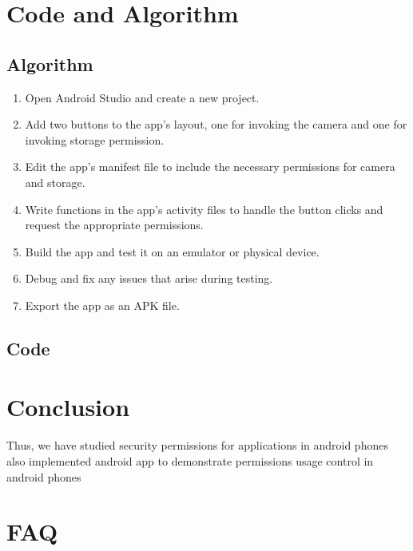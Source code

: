 \documentclass[11pt]{article}
\begin{document}
\section{Code and Algorithm}
\subsection{Algorithm}
\begin{enumerate}
    \item Open Android Studio and create a new project.
    \item Add two buttons to the app's layout, one for invoking the camera and one for invoking storage permission.
    \item Edit the app's manifest file to include the necessary permissions for camera and storage.
    \item Write functions in the app's activity files to handle the button clicks and request the appropriate permissions.
    \item Build the app and test it on an emulator or physical device.
    \item Debug and fix any issues that arise during testing.
    \item Export the app as an APK file.
\end{enumerate}

\subsection{Code}





\section{Conclusion}
Thus, we have studied security permissions for applications in android phones also
implemented android app to demonstrate permissions usage control in android phones
\clearpage

\section{FAQ}
\end{document}
